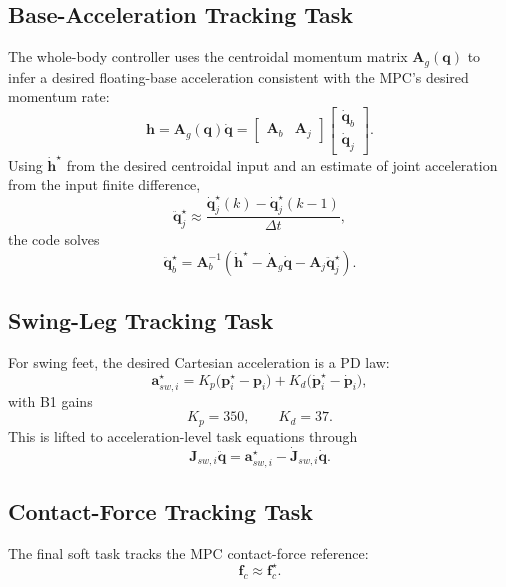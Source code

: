 \documentclass[11pt,a4paper]{article}
\newcommand{\vect}[1]{\bm{#1}}
\newcommand{\mat}[1]{\bm{#1}}
\begin{document}
\subsection{Base-Acceleration Tracking Task}
The whole-body controller uses the centroidal momentum matrix \(\mat{A}_g(\vect{q})\) to infer a desired floating-base acceleration consistent with the MPC's desired momentum rate:
\begin{equation}
\vect{h} = \mat{A}_g(\vect{q}) \dot{\vect{q}} =
\begin{bmatrix}
\mat{A}_b & \mat{A}_j
\end{bmatrix}
\begin{bmatrix}
\dot{\vect{q}}_b \\
\dot{\vect{q}}_j
\end{bmatrix}.
\end{equation}
Using \(\dot{\vect{h}}^\star\) from the desired centroidal input and an estimate of joint acceleration from the input finite difference,
\begin{equation}
\ddot{\vect{q}}_j^\star \approx
\frac{\dot{\vect{q}}_j^{\star}(k) - \dot{\vect{q}}_j^{\star}(k-1)}{\Delta t},
\end{equation}
the code solves
\begin{equation}
\ddot{\vect{q}}_b^\star =
\mat{A}_b^{-1}
\left(
\dot{\vect{h}}^\star
- \dot{\mat{A}}_g \dot{\vect{q}}
- \mat{A}_j \ddot{\vect{q}}_j^\star
\right).
\end{equation}

\subsection{Swing-Leg Tracking Task}
For swing feet, the desired Cartesian acceleration is a PD law:
\begin{equation}
\vect{a}_{sw,i}^{\star} =
K_p \big(\vect{p}_{i}^{\star} - \vect{p}_{i}\big) +
K_d \big(\dot{\vect{p}}_{i}^{\star} - \dot{\vect{p}}_{i}\big),
\end{equation}
with B1 gains
\begin{equation}
K_p = 350,\qquad K_d = 37.
\end{equation}
This is lifted to acceleration-level task equations through
\begin{equation}
\mat{J}_{sw,i}\ddot{\vect{q}} = \vect{a}_{sw,i}^{\star} - \dot{\mat{J}}_{sw,i}\dot{\vect{q}}.
\end{equation}

\subsection{Contact-Force Tracking Task}
The final soft task tracks the MPC contact-force reference:
\begin{equation}
\vect{f}_c \approx \vect{f}_c^\star.
\end{equation}
\end{document}
